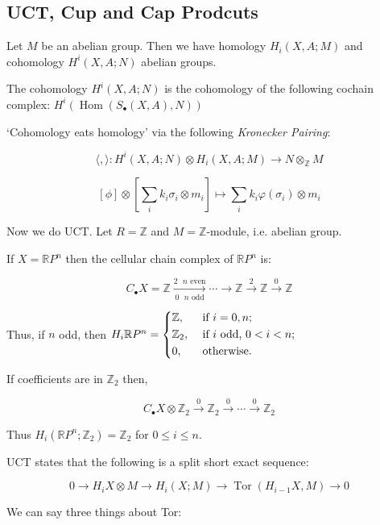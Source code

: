 \documentclass{article}
\theoremstyle{definition}
\begin{document}
    \subsection*{UCT, Cup and Cap Prodcuts}
    
    Let \(M\) be an abelian group. Then we have homology \(H_i(X,A;M)\) and cohomology \(H^i(X,A;N)\) abelian groups.
    
    The cohomology \(H^i(X,A;N)\) is the cohomology of the following cochain complex: \(H^i(\operatorname{Hom} (S_\bullet(X,A),N))\) 

    `Cohomology eats homology' via the following \textit{Kronecker Pairing}:

    \[
        \langle , \rangle: H^i(X,A;N) \otimes H_i(X,A;M) \to N \otimes_\mathbb{Z} M
    \]

    \[
        [\phi] \otimes \left[ \sum_{i} k_i \sigma_i \otimes m_i \right] \mapsto \sum_{i} k_i \varphi (\sigma_i) \otimes m_i
    \]

    Now we do UCT. Let \(R = \mathbb{Z}\) and \(M = \mathbb{Z}\)-module, i.e. abelian group.
    
    If \(X = \mathbb{R} P^n\) then the cellular chain complex of \(\mathbb{R} P^n\) is:

    \[
        C_\bullet X = \mathbb{Z} \xrightarrow[0 \text{ \(n\) odd}]{2 \text{ \(n\) even}}\cdots \to \mathbb{Z} \xrightarrow{2} \mathbb{Z} \xrightarrow{0} \mathbb{Z}
    \]

    Thus, if \(n\) odd, then \(H_i \mathbb{R} P^n = \begin{dcases}
        \mathbb{Z} , &\text{ if } i = 0,n ;\\
        \mathbb{Z} _2, &\text{ if } i \text{ odd, } 0 < i < n ;\\
        0, &\text{ otherwise} .
    \end{dcases}\)

    If coefficients are in \(\mathbb{Z}_2\) then,
    
    \[
        C_\bullet X \otimes \mathbb{Z}_2 \xrightarrow{0} \mathbb{Z}_2 \xrightarrow{0} \cdots \xrightarrow{0} \mathbb{Z}_2
    \]

    Thus \(H_i (\mathbb{R} P^n;\mathbb{Z}_2) = \mathbb{Z}_2\) for \(0 \leq i \leq n\).

    UCT states that the following is a split short exact sequence:

    \[
        0 \to H_i X \otimes M \to H_i(X;M) \to \operatorname{Tor} (H_{i-1} X,M) \to 0
    \]

    We can say three things about Tor:
\end{document}
